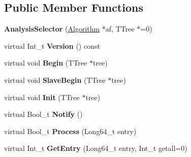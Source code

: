 \subsection*{Public Member Functions}
\begin{DoxyCompactItemize}
\item 
\hypertarget{class_h_a_l_1_1_analysis_selector_a0e69d567472b846500e3758d0e1cafd3}{{\bfseries Analysis\+Selector} (\hyperlink{class_h_a_l_1_1_algorithm}{Algorithm} $\ast$af, T\+Tree $\ast$=0)}\label{class_h_a_l_1_1_analysis_selector_a0e69d567472b846500e3758d0e1cafd3}

\item 
\hypertarget{class_h_a_l_1_1_analysis_selector_a674eacd53bc6d9b2b82d5769ecf4c965}{virtual Int\+\_\+t {\bfseries Version} () const }\label{class_h_a_l_1_1_analysis_selector_a674eacd53bc6d9b2b82d5769ecf4c965}

\item 
\hypertarget{class_h_a_l_1_1_analysis_selector_aee810e2db449acf3c75cf0c7ed085318}{virtual void {\bfseries Begin} (T\+Tree $\ast$tree)}\label{class_h_a_l_1_1_analysis_selector_aee810e2db449acf3c75cf0c7ed085318}

\item 
\hypertarget{class_h_a_l_1_1_analysis_selector_a47feee7290d251295e65bc69b4e5b982}{virtual void {\bfseries Slave\+Begin} (T\+Tree $\ast$tree)}\label{class_h_a_l_1_1_analysis_selector_a47feee7290d251295e65bc69b4e5b982}

\item 
\hypertarget{class_h_a_l_1_1_analysis_selector_a73f70c38aab67b59e030bfa3e5182d3c}{virtual void {\bfseries Init} (T\+Tree $\ast$tree)}\label{class_h_a_l_1_1_analysis_selector_a73f70c38aab67b59e030bfa3e5182d3c}

\item 
\hypertarget{class_h_a_l_1_1_analysis_selector_a5ce023e4ee2bbc1d6ea0437175258195}{virtual Bool\+\_\+t {\bfseries Notify} ()}\label{class_h_a_l_1_1_analysis_selector_a5ce023e4ee2bbc1d6ea0437175258195}

\item 
\hypertarget{class_h_a_l_1_1_analysis_selector_ad89da1b73776f3acd5e8200d51438e47}{virtual Bool\+\_\+t {\bfseries Process} (Long64\+\_\+t entry)}\label{class_h_a_l_1_1_analysis_selector_ad89da1b73776f3acd5e8200d51438e47}

\item 
\hypertarget{class_h_a_l_1_1_analysis_selector_ae34c9fc9d657cea4c277306043997440}{virtual Int\+\_\+t {\bfseries Get\+Entry} (Long64\+\_\+t entry, Int\+\_\+t getall=0)}\label{class_h_a_l_1_1_analysis_selector_ae34c9fc9d657cea4c277306043997440}


\end{DoxyCompactItemize}
